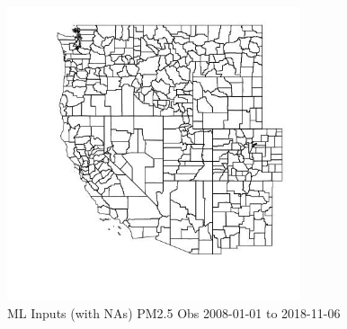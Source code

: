 \clearpage 

\begin{figure} 
\centering  
\includegraphics[width=0.77\textwidth]{Code_Outputs/Report_ML_input_PM25_Step4_part_e_de_duplicated_aves_compiled_2019-05-20wNAs_CountyPM25_ObsMean2008-01-01_2018-11-06.jpg} 
\caption{\label{fig:Report_ML_input_PM25_Step4_part_e_de_duplicated_aves_compiled_2019-05-20wNAsCountyPM25_ObsMean2008-01-01_2018-11-06}ML Inputs (with NAs) PM2.5 Obs 2008-01-01 to 2018-11-06} 
\end{figure} 
 
